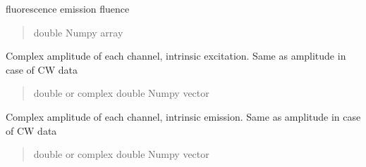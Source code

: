 \documentclass[letterpaper,10pt,english]{sphinxmanual}
\begin{document}
\begin{fulllineitems}
\begin{fulllineitems}
\label{\detokenize{_autosummary/nirfasterff.base.data.FLdata:nirfasterff.base.data.FLdata.phifl}}
\pysigstartsignatures
\pysigline
{}
\pysigstopsignatures
\sphinxAtStartPar
fluorescence emission fluence
\begin{quote}\begin{description}
\sphinxAtStartPar
double Numpy array

\end{description}\end{quote}

\end{fulllineitems}


\begin{fulllineitems}
\label{\detokenize{_autosummary/nirfasterff.base.data.FLdata:nirfasterff.base.data.FLdata.complexx}}
\pysigstartsignatures
\pysigline
{}
\pysigstopsignatures
\sphinxAtStartPar
Complex amplitude of each channel, intrinsic excitation. Same as amplitude in case of CW data
\begin{quote}\begin{description}
\sphinxAtStartPar
double or complex double Numpy vector

\end{description}\end{quote}

\end{fulllineitems}


\begin{fulllineitems}
\label{\detokenize{_autosummary/nirfasterff.base.data.FLdata:nirfasterff.base.data.FLdata.complexmm}}
\pysigstartsignatures
\pysigline
{}
\pysigstopsignatures
\sphinxAtStartPar
Complex amplitude of each channel, intrinsic emission. Same as amplitude in case of CW data
\begin{quote}\begin{description}
\sphinxAtStartPar
double or complex double Numpy vector


\end{description}
\end{quote}
\end{fulllineitems}
\end{fulllineitems}
\end{document}
